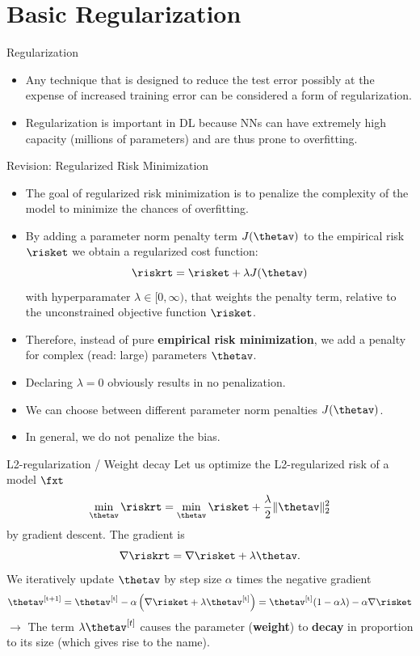 \section{Basic Regularization}

\begin{frame} {Regularization}
\begin{itemize}
\item Any technique that is designed to reduce the test error possibly at the expense of increased training error can be considered a form of regularization.
\item Regularization is important in DL because NNs can have extremely high capacity (millions of parameters) and are thus prone to overfitting.
\end{itemize}
\end{frame}

\begin{vbframe}{Revision: Regularized Risk Minimization}
\begin{itemize}
\item The goal of regularized risk minimization is to penalize the complexity of the model to minimize the chances of overfitting.
\item By adding a parameter norm penalty term \(J(\thetav)\) to the empirical risk $\risket$ we obtain a regularized cost function:
$$\riskrt = \risket + \lambda \text{\(J(\thetav)\)}$$
with hyperparamater $\lambda \in [0, \infty)$, that weights the penalty term, relative to the unconstrained objective function $\risket$.
\item Therefore, instead of pure \textbf{empirical risk minimization}, we add a penalty
for complex (read: large) parameters \(\thetav\).
\item Declaring $\lambda = 0$ obviously results in no penalization.
\item We can choose between different parameter norm penalties \(J(\thetav)\).
\item In general, we do not penalize the bias.
\end{itemize}
\end{vbframe}

\begin{vbframe}{L2-regularization / Weight decay}
Let us optimize the L2-regularized risk of a model $\fxt$
\[\min_{\thetav} \riskrt = \min_{\thetav} \risket + \frac{\lambda}{2} \|\thetav\|^2_2\]
by gradient descent. The gradient is
\[\nabla \riskrt = \nabla \risket + \lambda \thetav.\]
We iteratively update $\thetav$ by step size \(\alpha\) times the
negative gradient
\[\thetav^{[\text{t+1}]} = \thetav^{[\text{t}]} - \alpha \left(\nabla \risket + \lambda \thetav^{[\text{t}]}\right) =
\thetav^{[\text{t}]} (1 - \alpha \lambda) - \alpha \nabla \risket\]
$\to$ The term \(\lambda \thetav^{[t]}\) causes the parameter
(\textbf{weight}) to \textbf{decay} in proportion to its size (which gives rise to the name). 
\end{vbframe}

